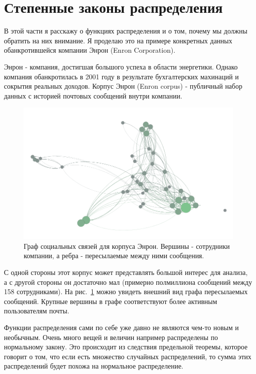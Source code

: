 \section{Степенные законы распределения}

В этой части я расскажу о функциях распределения и о том, почему мы должны обратить на них внимание. Я проделаю это на примере конкретных данных обанкротившейся компании Энрон (Enron Corporation).

Энрон - компания, достигшая большого успеха в области энергетики. Однако компания обанкротилась в 2001 году в результате бухгалтерских махинаций и сокрытия реальных доходов\cite{enron_fall}. Корпус Энрон (Enron corpus) - публичный набор данных с историей почтовых сообщений внутри компании.

\begin{figure}[H]
 \includegraphics[width=1\linewidth]{recources/enron/enron_social_network_graph}
 \caption{Граф социальных связей для корпуса Энрон. Вершины - сотрудники компании, а ребра - пересылаемые между ними сообщения.}
 \label{fig:enron_social_network_graph}
\end{figure}

С одной стороны этот корпус может представлять большой интерес для анализа, а с другой стороны он достаточно мал (примерно полмиллиона сообщений между 158 сотрудниками\cite{sims_sinitsyn_matrix_structures}). На рис.~\ref{fig:enron_social_network_graph} можно увидеть внешний вид графа пересылаемых сообщений. Крупные вершины в графе соответствуют более активным пользователям почты.

Функции распределения сами по себе уже давно не являются чем-то новым и необычным. Очень много вещей и величин например распределены по нормальному закону. Это происходит из следствия предельной теоремы, которое говорит о том, что если есть множество случайных распределений, то сумма этих распределений будет похожа на нормальное распределение. 

